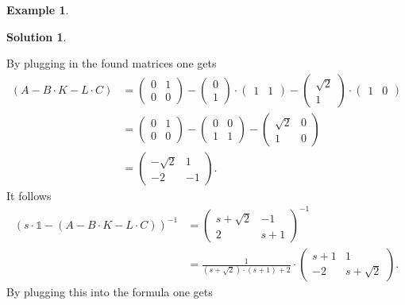 \documentclass[a4paper,12 pt]{article}
\numberwithin{equation}{section}
\theoremstyle{definition}
\newtheorem{bsp}{Example}
\theoremstyle{remark}
\theoremstyle{definition}
\newtheorem*{lsg}{Solution}
\theoremstyle{definition}
\theoremstyle{definition}
\theoremstyle{remark}
\begin{document}
\begin{bsp}
\begin{lsg}
\begin{enumerate}[(a)]
\begin{equation*}
\end{equation*}
By plugging in the found matrices one gets
\begin{equation*}
\begin{split}
(A-B\cdot K-L\cdot C)&=\begin{pmatrix}
0&1\\ 0&0 \end{pmatrix} -\begin{pmatrix} 0\\ 1 
\end{pmatrix}\cdot \begin{pmatrix} 1&1 \end{pmatrix} -\begin{pmatrix} \sqrt{2}\\ 1 \end{pmatrix} \cdot \begin{pmatrix} 1&0\end{pmatrix}\\
&=\begin{pmatrix}
0&1\\ 0&0 \end{pmatrix}- \begin{pmatrix} 
 0&0\\ 1&1
 \end{pmatrix}-\begin{pmatrix}
\sqrt{2}&0\\ 1 & 0 
\end{pmatrix}\\
&=\begin{pmatrix}
-\sqrt{2}&1\\
-2&-1
\end{pmatrix}.
\end{split}
\end{equation*}
It follows
\begin{equation*}
\begin{split}
(s\cdot \mathbb{1}-(A-B\cdot K -L\cdot C))^{-1}&=\begin{pmatrix}
s+\sqrt{2} & -1\\
2&s+1
\end{pmatrix}^{-1}\\
&=\frac{1}{(s+\sqrt{2})\cdot (s+1) +2}\cdot \begin{pmatrix}
s+1 & 1\\
-2&s+\sqrt{2}
\end{pmatrix}.
\end{split}
\end{equation*}
By plugging this into the formula one gets
\begin{equation*}

\end{equation*}
\end{enumerate}
\end{lsg}
\end{bsp}
\end{document}

